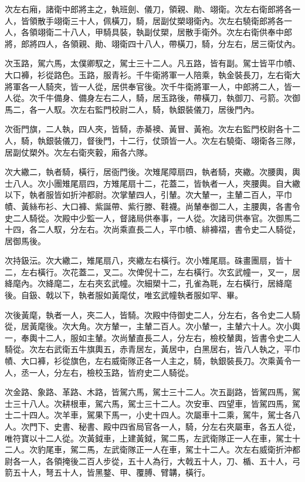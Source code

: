 \begin{pinyinscope}
 次左右廂，諸衛中郎將主之，執班劍、儀刀，領親、勛、翊衛。次左右衛郎將各一人，皆領散手翊衛三十人，佩橫刀，騎，居副仗槊翊衛內。次左右驍衛郎將各一人，各領翊衛二十八人，甲騎具裝，執副仗槊，居散手衛外。次左右衛供奉中郎將，郎將四人，各領親、勛、翊衛四十八人，帶橫刀，騎，分左右，居三衛仗內。



 次玉路，駕六馬，太僕卿馭之，駕士三十二人。凡五路，皆有副。駕士皆平巾幘、大口褲，衫從路色。玉路，服青衫。千牛衛將軍一人陪乘，執金裝長刀，左右衛大將軍各一人騎夾，皆一人從，居供奉官後。次千牛衛將軍一人，中郎將二人，皆一人從。次千牛備身、備身左右二人，騎，居玉路後，帶橫刀，執御刀、弓箭。次御馬二，各一人馭。次左右監門校尉二人，騎，執銀裝儀刀，居後門內。



 次衙門旗，二人執，四人夾，皆騎，赤綦襖、黃冒、黃袍。次左右監門校尉各十二人，騎，執銀裝儀刀，督後門，十二行，仗頭皆一人。次左右驍衛、翊衛各三隊，居副仗槊外。次左右衛夾轂，廂各六隊。



 次大繖二，執者騎，橫行，居衙門後。次雉尾障扇四，執者騎，夾繖。次腰輿，輿士八人。次小團雉尾扇四，方雉尾扇十二，花蓋二，皆執者一人，夾腰輿。自大繖以下，執者服皆如折沖都尉。次掌輦四人，引輦。次大輦一，主輦二百人，平巾幘、黃絲布衫、大口褲、紫誕帶、紫行滕、鞋襪。尚輦奉御二人，主腰輿，各書令史二人騎從。次殿中少監一人，督諸局供奉事，一人從。次諸司供奉官。次御馬二十四，各二人馭，分左右。次尚乘直長二人，平巾幘、緋褲褶，書令史二人騎從，居御馬後。



 次持鈒沄。次大繖二，雉尾扇八，夾繖左右橫行。次小雉尾扇。硃畫團扇，皆十二，左右橫行。次花蓋二，叉二。次俾倪十二，左右橫行。次玄武幢一，叉一，居絳麾內。次絳麾二，左右夾玄武幢。次細槊十二，孔雀為毦，左右橫行，居絳麾後。自鈒、戟以下，執者服如黃麾仗，唯玄武幢執者服如罕、畢。



 次後黃麾，執者一人，夾二人，皆騎。次殿中侍御史二人，分左右，各令史二人騎從，居黃麾後。次大角。次方輦一，主輦二百人。次小輦一，主輦六十人。次小輿一，奉輿十二人，服如主輦。次尚輦直長二人，分左右，檢校輦輿，皆書令史二人騎從。次左右武衛五牛旗輿五，赤青居左，黃居中，白黑居右，皆八人執之，平巾幘、大口褲，衫從旗色，左右威衛隊正各一人主之，騎，執銀裝長刀。次乘黃令一人，丞一人，分左右，檢校玉路，皆府史二人騎從。



 次金路、象路、革路、木路，皆駕六馬，駕士三十二人。次五副路，皆駕四馬，駕士三十八人。次耕根車，駕六馬，駕士三十二人。次安車、四望車，皆駕四馬，駕士二十四人。次羊車，駕果下馬一，小史十四人。次屬車十二乘，駕牛，駕士各八人。次門下、史書、秘書、殿中四省局官各一人，騎，分左右夾屬車，各五人從，唯符寶以十二人從。次黃鉞車，上建黃鉞，駕二馬，左武衛隊正一人在車，駕士十二人。次豹尾車，駕二馬，左武衛隊正一人在車，駕士十二人。次左右威衛折沖都尉各一人，各領掩後二百人步從，五十人為行，大戟五十人，刀、楯、五十人，弓箭五十人，弩五十人，皆黑鍪、甲、覆膊、臂韝，橫行。




\end{pinyinscope}
